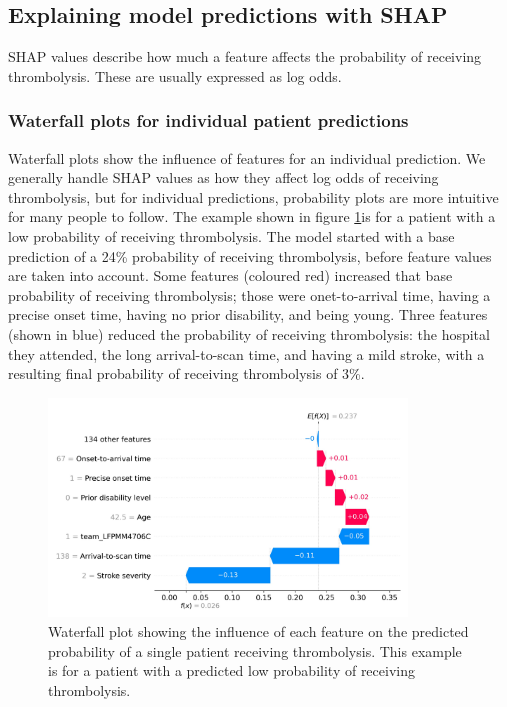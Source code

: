 
\subsection{Explaining model predictions with SHAP}

SHAP values describe how much a feature affects the probability of receiving thrombolysis. These are usually expressed as log odds.


\subsubsection{Waterfall plots for individual patient predictions}

Waterfall plots show the influence of features for an individual prediction. We generally handle SHAP values as how they affect log odds of receiving thrombolysis, but for individual predictions, probability plots are more intuitive for many people to follow. The example shown in figure \ref{fig:waterfall_low}is for a patient with a low probability of receiving thrombolysis. The model started with a base prediction of a 24\% probability of receiving thrombolysis, before feature values are taken into account. Some features (coloured red) increased that base probability of receiving thrombolysis; those were onet-to-arrival time, having a precise onset time, having no prior disability, and being young. Three features (shown in blue) reduced the probability of receiving thrombolysis: the hospital they attended, the long arrival-to-scan time, and having a mild stroke, with a resulting final probability of receiving thrombolysis of 3\%.

\begin{figure}
\centering
\includegraphics[width=0.85\textwidth]{./images/03_xgb_10_features_waterfall_probability_low}
\caption{Waterfall plot showing the influence of each feature on the predicted probability of a single patient receiving thrombolysis. This example is for a patient with a predicted low probability of receiving thrombolysis.}
\label{fig:waterfall_low}
\end{figure}

